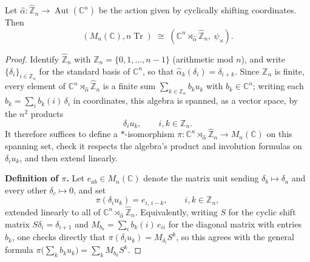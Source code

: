 \begin{lemma}\label{lem:iso}
    Let \( \widehat\alpha \colon \widehat{\mathbb{Z}}_n \to
    \operatorname{Aut}(\mathbb{C}^n) \)
    be the action given by cyclically shifting coordinates. Then
    \[
        (M_n (\mathbb{C}), n\operatorname{Tr}) \;\cong\; (\mathbb{C}^n
        \rtimes_{\widehat\alpha} \widehat{\mathbb{Z}}_n,\ \psi_\rtimes).
    \]
\end{lemma}

\begin{proof}
    Identify \( \widehat{\mathbb{Z}}_n \) with \( \mathbb{Z}_n =
    \{0,1,\dots,n-1\} \) (arithmetic mod \( n \)), and write
    \( \{\delta_i\}_{i \in \mathbb{Z}_n} \) for the standard basis of
    \( \mathbb{C}^n \), so that \( \widehat\alpha_k(\delta_i) = \delta_{i+k} \).
    Since \( \mathbb{Z}_n \) is finite, every element of
    \( \mathbb{C}^n \rtimes_{\widehat\alpha} \widehat{\mathbb{Z}}_n \) is a
    finite sum \( \sum_{k\in\mathbb{Z}_n} b_k u_k \) with \( b_k \in
    \mathbb{C}^n \);
    writing each \( b_k = \sum_i b_k(i)\,\delta_i \) in coordinates, this
    algebra is spanned, as a vector space, by the \( n^2 \) products
    \[
        \delta_i u_k, \qquad i,k \in \mathbb{Z}_n.
    \]
    It therefore suffices to define a \( * \)-isomorphism
    \( \pi \colon \mathbb{C}^n \rtimes_{\widehat\alpha}
    \widehat{\mathbb{Z}}_n \to M_n  (\mathbb{C}) \)
    on this spanning set, check it respects the algebra's product and
    involution formulas on \( \delta_i u_k \), and then extend linearly.

    \textbf{Definition of \( \pi \).} Let \( e_{ab} \in M_n
    (\mathbb{C}) \) denote
    the matrix unit sending \( \delta_b \mapsto \delta_a \) and every
    other \( \delta_c \mapsto 0 \), and set
    \[
        \pi(\delta_i u_k) = e_{i,\,i-k}, \qquad i,k \in \mathbb{Z}_n,
    \]
    extended linearly to all of \( \mathbb{C}^n
    \rtimes_{\widehat\alpha}\widehat{\mathbb{Z}}_n \).
    Equivalently, writing \( S \) for the cyclic shift matrix
    \( S\delta_i = \delta_{i+1} \) and \( M_{b_k} = \sum_i b_k(i)\,e_{ii} \)
    for the diagonal matrix with entries \( b_k \), one checks directly
    that \( \pi(\delta_i u_k) = M_{\delta_i}S^k \), so this agrees with
    the general formula \( \pi\big(\sum_k b_k u_k\big) = \sum_k M_{b_k}S^k \).


\end{proof}
